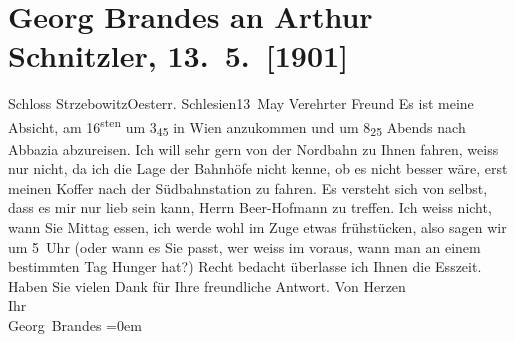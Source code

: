 

         
         \renewcommand{\erwaehntePersonen}{Personen: Richard Beer-Hofmann}
         \renewcommand{\erwaehnteOrte}{Orte: Nordbahnhof, Opatija, Ostrava, Schlesien, Schloss Strzebowitz, Südbahnhof, Wien}
         \renewcommand{\erwaehnteWerke}{}
               \section[Georg Brandes an Arthur Schnitzler, 13. 5. {[}1901{]}]{ Georg Brandes an Arthur Schnitzler, 13. 5. {[}1901{]}}\nopagebreak{}\rehead{ }\begin{ledgroupsized}[t]{13cm}\normalsize\beginnumbering \toendnotes[C]{\smallbreak\pagebreak[2]} 
\pstart
           \raggedleft{}{\pb}Schloss StrzebowitzOesterr. Schlesien13 May\pend
           \pstart{}Verehrter Freund\pend\pstart
           Es ist meine Absicht, am 16\textsuperscript{sten} um 3\textsubscript{45} in Wien anzukommen und um 8\textsubscript{25} Abends nach Abbazia abzureisen.\pend
           \pstart
           Ich will sehr gern von der Nordbahn zu Ihnen
               fahren, weiss nur nicht, da ich die Lage der Bahnhöfe nicht kenne, ob es nicht besser
               wäre, erst meinen Koffer nach der Südbahnstation
               zu fahren.\pend
           \pstart
           Es versteht sich von selbst, dass es mir nur lieb sein kann, Herrn Beer-Hofmann zu treffen. Ich weiss nicht, wann
               Sie Mittag essen, ich werde wohl im Zuge etwas frühstücken, also sagen wir um
                  5 Uhr{ }{\pb}(oder wann es Sie passt, wer
               weiss im voraus, wann man an einem bestimmten Tag Hunger hat?) Recht bedacht
               überlasse ich Ihnen die Esszeit.\pend
           \pstart
           Haben Sie vielen Dank für Ihre freundliche Antwort.\pend
           \pstart
           Von Herzen{\\[\baselineskip]}Ihr{\\[\baselineskip]}\spacefill\mbox{Georg Brandes}\pend
           \leftskip=0em{}
         

\end{ledgroupsized}
